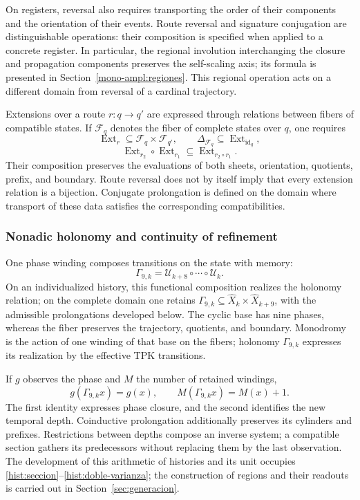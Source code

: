 On registers, reversal also requires transporting the order
of their components and the orientation of their events. Route
reversal and signature conjugation are distinguishable operations: their
composition is specified when applied to a concrete register. In
particular, the regional involution interchanging the closure
and propagation components preserves the self-scaling axis; its formula is
presented in Section~\ref{mono-ampl:regiones}. This regional operation
acts on a different domain from reversal of a cardinal trajectory.

Extensions over a route \(r:q\to q'\) are expressed through
relations between fibers of compatible states. If \(\mathcal F_q\)
denotes the fiber of complete states over \(q\), one requires
\[
 \operatorname{Ext}_r\subseteq\mathcal F_q\times\mathcal F_{q'},
 \qquad \Delta_{\mathcal F_q}\subseteq
        \operatorname{Ext}_{\operatorname{id}_q},
\]
\[
 \operatorname{Ext}_{r_2}\circ\operatorname{Ext}_{r_1}
       \subseteq\operatorname{Ext}_{r_2\circ r_1}.
\]
Their composition preserves the evaluations of both sheets, orientation,
quotients, prefix, and boundary. Route reversal does not
by itself imply that every extension relation is a bijection.
Conjugate prolongation is defined on the domain where transport of
these data satisfies the corresponding compatibilities.

\subsubsection{Nonadic holonomy and continuity of refinement}
\label{tpk-int:holonomia}

One phase winding composes transitions on the state with memory:
\begin{equation}
 \Gamma_{9,k}=\mathcal U_{k+8}\circ\cdots\circ\mathcal U_k.
 \label{tpk-int:gamma}
\end{equation}
On an individualized history, this functional composition realizes
the holonomy relation; on the complete domain one retains
\(\Gamma_{9,k}\subseteq\widehat X_k\times\widehat X_{k+9}\),
with the admissible prolongations developed below.
The cyclic base has nine phases, whereas
the fiber preserves the trajectory, quotients, and boundary.
Monodromy is the action of one winding of that base on the fibers;
holonomy \(\Gamma_{9,k}\) expresses its realization by the effective
TPK transitions.

If \(g\) observes the phase and \(M\) the number of retained windings,
\[
 g(\Gamma_{9,k}x)=g(x),\qquad M(\Gamma_{9,k}x)=M(x)+1.
\]
The first identity expresses phase closure, and the second identifies
the new temporal depth. Coinductive prolongation additionally preserves
its cylinders and prefixes. Restrictions between depths
compose an inverse system; a compatible section gathers its
predecessors without replacing them by the last observation. The development
of this arithmetic of histories and its unit occupies
\ref{hist:seccion}--\ref{hist:doble-varianza}; the construction of
regions and their readouts is carried out in Section~\ref{sec:generacion}.

